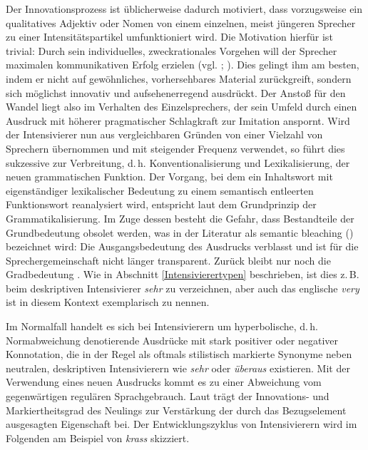 Der Innovationsprozess ist üblicherweise dadurch motiviert, dass vorzugsweise ein qualitatives Adjektiv oder Nomen von einem einzelnen, meist jüngeren Sprecher zu einer Intensitätspartikel umfunktioniert wird. Die Motivation hierfür ist trivial: Durch sein individuelles, zweckrationales Vorgehen will der Sprecher maximalen kommunikativen Erfolg erzielen (vgl. {\citealt[92]{Keller.1994}}; \citealt[189ff.]{Kirschbaum.2002b}). Dies gelingt ihm am besten, indem er nicht auf gewöhnliches, vorhersehbares Material zurückgreift, sondern sich möglichst innovativ und aufsehenerregend ausdrückt. Der Anstoß für den Wandel liegt also im Verhalten des Einzelsprechers, der sein Umfeld durch einen Ausdruck mit höherer pragmatischer Schlagkraft zur Imitation anspornt. Wird der Intensivierer nun aus vergleichbaren Gründen von einer Vielzahl von Sprechern übernommen und mit steigender Frequenz verwendet, so führt dies sukzessive zur Verbreitung, d.\,h. Konventionalisierung und Lexikalisierung, der neuen grammatischen Funktion. Der Vorgang, bei dem ein Inhaltswort mit eigenständiger lexikalischer Bedeutung zu einem semantisch entleerten Funktionswort reanalysiert wird, entspricht laut \citet[2]{Heine.2002a} dem Grundprinzip der Grammatikalisierung. Im Zuge dessen besteht die Gefahr, dass Bestandteile der Grundbedeutung obsolet werden, was in der Literatur als \glqq{}semantic bleaching\grqq{} (\citealt[2]{Heine.2002a}) bezeichnet wird: Die Ausgangsbedeutung des Ausdrucks verblasst und ist für die Sprechergemeinschaft nicht länger transparent. Zurück bleibt nur noch die Gradbedeutung {\citep[vgl.][74f.]{Sahel.2013}}. Wie in Abschnitt \ref{Intensivierertypen} beschrieben, ist dies z.\,B. beim deskriptiven Intensivierer \textit{sehr} zu verzeichnen, aber auch das englische \textit{very} ist in diesem Kontext exemplarisch zu nennen.


Im Normalfall handelt es sich bei Intensivierern um hyperbolische, d.\,h. Normabweichung denotierende Ausdrücke mit stark positiver oder negativer Konnotation, die in der Regel als oftmals stilistisch markierte Synonyme neben neutralen, deskriptiven Intensivierern wie \textit{sehr} oder \textit{überaus} existieren. Mit der Verwendung eines neuen Ausdrucks kommt es zu einer Abweichung vom gegenwärtigen regulären Sprachgebrauch. Laut \citet[352]{Claudi.2006} trägt der Innovations- und Markiertheitsgrad des Neulings zur Verstärkung der durch das Bezugselement ausgesagten Eigenschaft bei. Der Entwicklungszyklus von Intensivierern wird im Folgenden am Beispiel von \textit{krass} skizziert.

